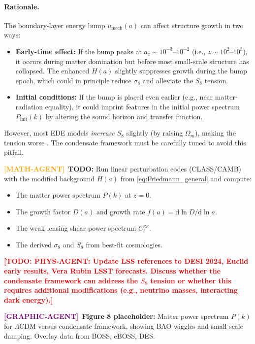 \documentclass[11pt,a4paper]{article}
\newcommand{\dx}{\mathrm{d}}
\newcommand{\ac}{a_{\mathrm{c}}}
\newcommand{\umech}{u_{\mathrm{mech}}}
\theoremstyle{definition}
\newcommand{\TODO}[1]{\textcolor{red}{\textbf{[TODO: #1]}}}
\newcommand{\MATHAGENT}{\textcolor{orange}{\textbf{[MATH-AGENT]}}}
\newcommand{\GRAPHAGENT}{\textcolor{purple}{\textbf{[GRAPHIC-AGENT]}}}
\begin{document}
\paragraph{Rationale.}
The boundary-layer energy bump $\umech(a)$ can affect structure growth in two ways:
\begin{itemize}[leftmargin=1.8em]
  \item \textbf{Early-time effect:} If the bump peaks at $\ac \sim 10^{-3}$--$10^{-2}$ (i.e., $z \sim 10^2$--$10^3$), it occurs during matter domination but before most small-scale structure has collapsed. The enhanced $H(a)$ slightly suppresses growth during the bump epoch, which could in principle reduce $\sigma_8$ and alleviate the $S_8$ tension.
  \item \textbf{Initial conditions:} If the bump is placed even earlier (e.g., near matter-radiation equality), it could imprint features in the initial power spectrum $P_{\mathrm{init}}(k)$ by altering the sound horizon and transfer function.
\end{itemize}

However, most EDE models \emph{increase} $S_8$ slightly (by raising $\Omega_m$), making the tension worse \cite{HillEDE2020}. The condensate framework must be carefully tuned to avoid this pitfall.

\MATHAGENT~\textbf{TODO:} Run linear perturbation codes (CLASS/CAMB) with the modified background $H(a)$ from \eqref{eq:Friedmann_general} and compute:
\begin{itemize}
  \item The matter power spectrum $P(k)$ at $z = 0$.
  \item The growth factor $D(a)$ and growth rate $f(a) = \dx \ln D / \dx \ln a$.
  \item The weak lensing shear power spectrum $C_\ell^{\kappa\kappa}$.
  \item The derived $\sigma_8$ and $S_8$ from best-fit cosmologies.
\end{itemize}

\TODO{PHYS-AGENT: Update LSS references to DESI 2024, Euclid early results, Vera Rubin LSST forecasts. Discuss whether the condensate framework can address the $S_8$ tension or whether this requires additional modifications (e.g., neutrino masses, interacting dark energy).}

\GRAPHAGENT~\textbf{Figure 8 placeholder:} Matter power spectrum $P(k)$ for $\Lambda$CDM versus condensate framework, showing BAO wiggles and small-scale damping. Overlay data from BOSS, eBOSS, DES.
\end{document}

